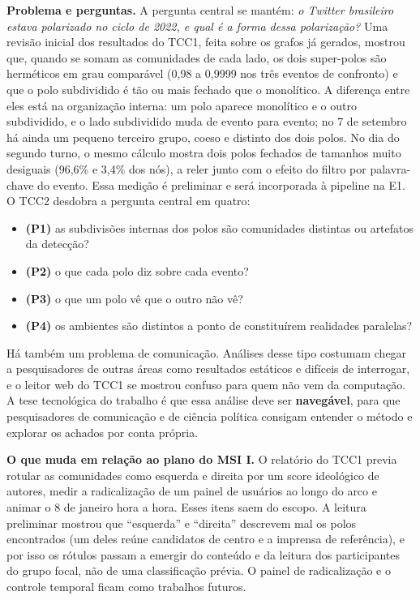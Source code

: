 \documentclass[12pt,a4paper,oneside]{article}
\begin{document}
\textbf{Problema e perguntas.} A pergunta central se mantém: \emph{o Twitter brasileiro estava polarizado no ciclo de 2022, e qual é a forma dessa polarização?} Uma revisão inicial dos resultados do TCC1, feita sobre os grafos já gerados, mostrou que, quando se somam as comunidades de cada lado, os dois super-polos são herméticos em grau comparável (0,98 a 0,9999 nos três eventos de confronto) e que o polo subdividido é tão ou mais fechado que o monolítico. A diferença entre eles está na organização interna: um polo aparece monolítico e o outro subdividido, e o lado subdividido muda de evento para evento; no 7 de setembro há ainda um pequeno terceiro grupo, coeso e distinto dos dois polos. No dia do segundo turno, o mesmo cálculo mostra dois polos fechados de tamanhos muito desiguais (96,6\% e 3,4\% dos nós), a reler junto com o efeito do filtro por palavra-chave do evento. Essa medição é preliminar e será incorporada à pipeline na E1. O TCC2 desdobra a pergunta central em quatro:

\begin{itemize}
\item \textbf{(P1)} as subdivisões internas dos polos são comunidades distintas ou artefatos da detecção?
\item \textbf{(P2)} o que cada polo diz sobre cada evento?
\item \textbf{(P3)} o que um polo vê que o outro não vê?
\item \textbf{(P4)} os ambientes são distintos a ponto de constituírem realidades paralelas?
\end{itemize}

Há também um problema de comunicação. Análises desse tipo costumam chegar a pesquisadores de outras áreas como resultados estáticos e difíceis de interrogar, e o leitor web do TCC1 se mostrou confuso para quem não vem da computação. A tese tecnológica do trabalho é que essa análise deve ser \textbf{navegável}, para que pesquisadores de comunicação e de ciência política consigam entender o método e explorar os achados por conta própria.

\textbf{O que muda em relação ao plano do MSI I.} O relatório do TCC1 previa rotular as comunidades como esquerda e direita por um score ideológico de autores, medir a radicalização de um painel de usuários ao longo do arco e animar o 8 de janeiro hora a hora. Esses itens saem do escopo. A leitura preliminar mostrou que ``esquerda'' e ``direita'' descrevem mal os polos encontrados (um deles reúne candidatos de centro e a imprensa de referência), e por isso os rótulos passam a emergir do conteúdo e da leitura dos participantes do grupo focal, não de uma classificação prévia. O painel de radicalização e o controle temporal ficam como trabalhos futuros.
\end{document}
